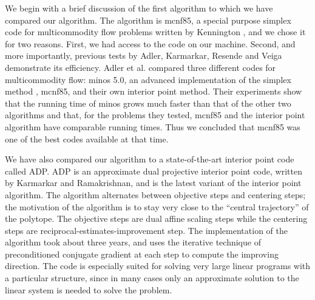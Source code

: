 We begin with a brief discussion of the first algorithm to which we have 
compared our algorithm.  
The algorithm is {\sc mcnf85}, a special purpose simplex code
for multicommodity flow problems written by Kennington \cite{Kennington79},
and we chose it for two reasons. 
First, we had access to the code on our machine.
Second, and more importantly, previous tests by 
Adler, Karmarkar, Resende and Veiga \cite{AdlerKRV89} 
demonstrate its efficiency.  
Adler et al. compared three different codes for multicommodity flow: 
{\sc minos 5.0},
an advanced implementation of the simplex method \cite{MurtaughS83},
{\sc mcnf85}, and their own interior point method.  
Their experiments show that the running time of {\sc minos} grows much
faster than that of the other two algorithms and that, 
for the problems they tested, 
{\sc mcnf85} and the interior point algorithm have comparable running times.
Thus we concluded that {\sc mcnf85} was one of the best codes
available at that time.  

We have also compared our algorithm to a state-of-the-art 
interior point code called ADP\cite{KarmarkarR91}.
 ADP is an
approximate dual projective interior point code, written by
Karmarkar and Ramakrishnan, and is the latest
variant of the interior point algorithm. The algorithm
alternates between objective steps and centering steps; the
motivation of the algorithm is to stay very close to the
``central trajectory'' of the polytope.  The objective steps are dual
affine scaling steps while the centering steps are
reciprocal-estimates-improvement step.
The implementation of the algorithm took about three years, and
uses the iterative technique of preconditioned conjugate gradient at
each step to compute the improving direction.
The code is especially suited for solving very
large linear programs with a particular structure, since in many cases
only an  approximate solution to the linear system is
needed to solve the problem.


